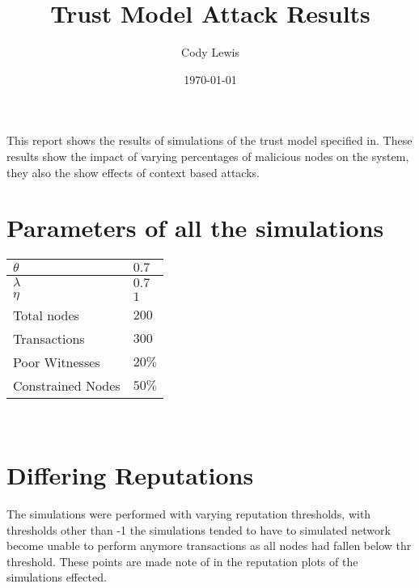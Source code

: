 \documentclass{article}
\title{Trust Model Attack Results}
\author{Cody Lewis}
\date{\today}
\begin{document}
  \maketitle
  \tableofcontents
  \newpage
  This report shows the results of simulations of the trust model specified
  in\cite{saied13}. These results show the impact of varying percentages of
  malicious nodes on the system, they also the show effects of context based
  attacks.

  \section{Parameters of all the simulations}
    \begin{tabularx}{\textwidth}{X X}
        \toprule
        $ \theta{} $ & $ 0.7 $ \\
        \midrule
        $ \lambda{} $ & $ 0.7 $ \\
        \midrule
        $ \eta{} $ & $ 1 $ \\
        \midrule
        Total nodes & $ 200 $ \\
        \midrule
        Transactions & $ 300 $ \\
        \midrule
        Poor Witnesses & $ 20\% $ \\
        \midrule
        Constrained Nodes & $ 50\% $ \\
        \bottomrule
    \end{tabularx} \\

    \section{Differing Reputations}
    The simulations were performed with varying reputation thresholds,
    with thresholds other than -1 the simulations tended to have to simulated
    network become unable to perform anymore transactions as all nodes had
    fallen below thr threshold. These points are made note of in the
    reputation plots of the simulations effected.\
\end{document}
